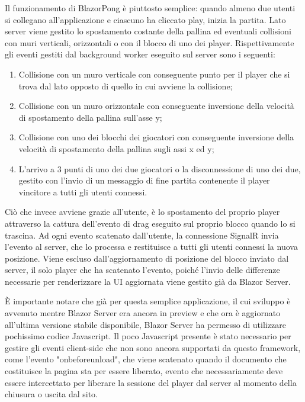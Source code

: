 Il funzionamento di BlazorPong \`e piuttosto semplice: quando almeno due utenti si collegano all'applicazione e ciascuno ha cliccato play, inizia la partita.
Lato server viene gestito lo spostamento costante della pallina ed eventuali collisioni con muri verticali, orizzontali o con il blocco di uno dei player.
Rispettivamente gli eventi gestiti dal background worker eseguito sul server sono i seguenti:
\begin{enumerate}
	\item Collisione con un muro verticale con conseguente punto per il player che si trova dal lato opposto di quello in cui avviene la collisione;
	\item Collisione con un muro orizzontale con conseguente inversione della velocit\`a di spostamento della pallina sull'asse y;
	\item Collisione con uno dei blocchi dei giocatori con conseguente inversione della velocit\`a di spostamento della pallina sugli assi x ed y;
	\item L'arrivo a 3 punti di uno dei due giocatori o la disconnessione di uno dei due, gestito con l'invio di un messaggio di fine partita contenente il player vincitore a tutti gli utenti connessi.
\end{enumerate}

Ci\`o che invece avviene grazie all'utente, \`e lo spostamento del proprio player attraverso la cattura dell'evento di drag eseguito sul proprio blocco quando lo si trascina.
Ad ogni evento scatenato dall'utente, la connessione SignalR invia l'evento al server, che lo processa e restituisce a tutti gli utenti connessi la nuova posizione.
Viene escluso dall'aggiornamento di posizione del blocco inviato dal server, il solo player che ha scatenato l'evento, poich\'e l'invio delle differenze necessarie per renderizzare la UI aggiornata viene gestito gi\`a da Blazor Server.

\`E importante notare che gi\`a per questa semplice applicazione, il cui sviluppo \`e avvenuto mentre Blazor Server era ancora in preview e che ora è aggiornato all'ultima versione stabile disponibile, Blazor Server ha permesso di utilizzare pochissimo codice Javascript.
Il poco Javascript presente \`e stato necessario per gestire gli eventi client-side che non sono ancora supportati da questo framework, come l'evento "onbeforeunload", che viene scatenato quando il documento che costituisce la pagina sta per essere liberato, evento che necessariamente deve essere intercettato per liberare la sessione del player dal server al momento della chiusura o uscita dal sito.


